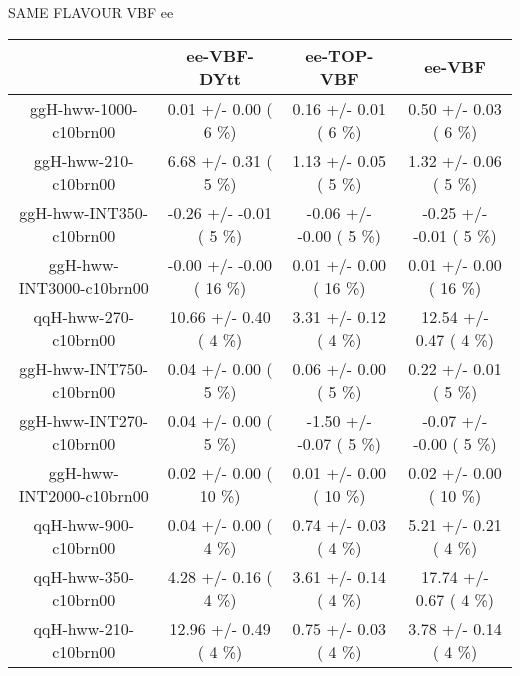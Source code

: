 \begin{table}[h!]\begin{center}
SAME FLAVOUR VBF ee\\

\footnotesize{\begin{tabular}{
c| c | c | c | } \hline
  &   ee-VBF-DYtt  &    ee-TOP-VBF  &        ee-VBF  \\ \hline
 ggH-hww-1000-c10brn00   &       0.01 +/-       0.00 (         6 \%)   &       0.16 +/-       0.01 (         6 \%)   &       0.50 +/-       0.03 (         6 \%)  \\
 ggH-hww-210-c10brn00   &       6.68 +/-       0.31 (         5 \%)   &       1.13 +/-       0.05 (         5 \%)   &       1.32 +/-       0.06 (         5 \%)  \\
 ggH-hww-INT350-c10brn00   &      -0.26 +/-      -0.01 (         5 \%)   &      -0.06 +/-      -0.00 (         5 \%)   &      -0.25 +/-      -0.01 (         5 \%)  \\
 ggH-hww-INT3000-c10brn00   &      -0.00 +/-      -0.00 (        16 \%)   &       0.01 +/-       0.00 (        16 \%)   &       0.01 +/-       0.00 (        16 \%)  \\
 qqH-hww-270-c10brn00   &      10.66 +/-       0.40 (         4 \%)   &       3.31 +/-       0.12 (         4 \%)   &      12.54 +/-       0.47 (         4 \%)  \\
 ggH-hww-INT750-c10brn00   &       0.04 +/-       0.00 (         5 \%)   &       0.06 +/-       0.00 (         5 \%)   &       0.22 +/-       0.01 (         5 \%)  \\
 ggH-hww-INT270-c10brn00   &       0.04 +/-       0.00 (         5 \%)   &      -1.50 +/-      -0.07 (         5 \%)   &      -0.07 +/-      -0.00 (         5 \%)  \\
 ggH-hww-INT2000-c10brn00   &       0.02 +/-       0.00 (        10 \%)   &       0.01 +/-       0.00 (        10 \%)   &       0.02 +/-       0.00 (        10 \%)  \\
 qqH-hww-900-c10brn00   &       0.04 +/-       0.00 (         4 \%)   &       0.74 +/-       0.03 (         4 \%)   &       5.21 +/-       0.21 (         4 \%)  \\
 qqH-hww-350-c10brn00   &       4.28 +/-       0.16 (         4 \%)   &       3.61 +/-       0.14 (         4 \%)   &      17.74 +/-       0.67 (         4 \%)  \\
 qqH-hww-210-c10brn00   &      12.96 +/-       0.49 (         4 \%)   &       0.75 +/-       0.03 (         4 \%)   &       3.78 +/-       0.14 (         4 \%)  \\

\end{tabular}}
\end{center}
\end{table}

